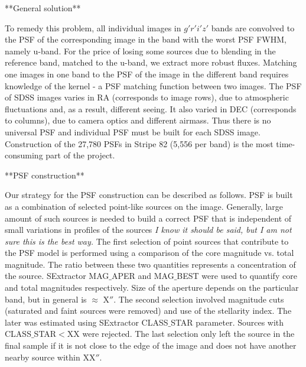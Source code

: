 \documentclass[numberedappendix,apj,twocolumn]{emulateapj}
\begin{document}
**General solution**

To remedy this problem, all individual images in $g'r'i'z'$ bands are convolved to the PSF of the corresponding image in the band with the worst PSF FWHM, namely u-band. For the price of losing some sources due to blending in the reference band, matched to the u-band, we extract more robust fluxes. Matching one images in one band to the PSF of the image in the different band requires knowledge of the kernel - a PSF matching function between two images. The PSF of SDSS images varies in RA (corresponds to image rows), due to atmospheric fluctuations and, as a result, different seeing. It also varied in DEC (corresponds to columns), due to camera optics and different airmass. Thus there is no universal PSF and individual PSF must be built for each SDSS image. Construction of the 27,780 PSFs in Stripe 82 (5,556 per band) is the most time-consuming part of the project.

**PSF construction**

Our strategy for the PSF construction can be described as follows. PSF is built as a combination of selected point-like sources on the image. Generally, large amount of such sources is needed to build a correct PSF that is independent of small variations in profiles of the sources \textit{I know it should be said, but I am not sure this is the best way.} The first selection of point sources that contribute to the PSF model is performed using a comparison of the core magnitude vs. total magnitude. The ratio between these two quantities represents a concentration of the source. SExtractor MAG$\_$APER and MAG$\_$BEST were used to quantify core and total magnitudes respectively. Size of the aperture depends on the particular band, but in general is $\approx$ X$''$.
The second selection involved magnitude cuts (saturated and faint sources were removed) and use of the stellarity index. The later was estimated using SExtractor CLASS$\_$STAR parameter. Sources with CLASS$\_$STAR$<$XX were rejected. The last selection only left the source in the final sample if it is not close to the edge of the image and does not have another nearby source within XX$''$. 
\end{document}
